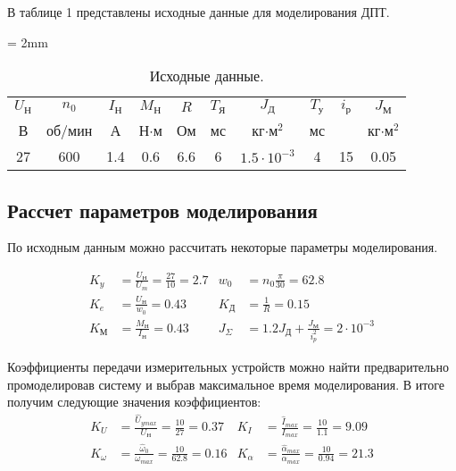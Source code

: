 \documentclass[a4paper, 12pt]{article}
\begin{document}
	В таблице 1 представлены исходные данные для моделирования ДПТ.
	\begin{table}[h!]
		\tabulinesep = 2mm
		\centering
		\begin{threeparttable}
			\caption{ Исходные данные.}\label{tab:perflogcross}
			\begin{tabular}{|c|c|c|c|c|c|c|c|c|c|}
				\hline
				$U_\text{Н}$ & $n_0$ & $I_\text{Н}$ & $M_\text{Н}$ & $R$ & $T_\text{Я}$ & $J_\text{Д}$ & $T_\text{у}$ & $i_\text{р}$ & $J_\text{М}$\\
				В & об/мин & А & Н$\cdot$м & Ом & мс & кг$\cdot\text{м}^2$ & мс & &  кг$\cdot\text{м}^2$ \\ \hline
				27 & 600 & 1.4 & 0.6 & 6.6 & 6 & $1.5\cdot10^{-3}$ & 4 & 15 & 0.05 \\
				\hline
			\end{tabular}
			
		\end{threeparttable}    
	\end{table}
	\newpage
	\begin{center}
		\section{Рассчет параметров моделирования}
	\end{center}
	\par По исходным данным можно рассчитать некоторые параметры моделирования.\par
	\begin{align*}
	K_y & = \frac{U_\text{Н}}{U_m} = \frac{27}{10} = 2.7 & w_0 & = n_0\frac{\pi}{30} = 62.8 \\
	K_e & = \frac{U_\text{Н}}{w_0} = 0.43 & K_\text{Д} & = \frac{1}{R} = 0.15 \\
	K_\text{М} & = \frac{M_\text{Н}}{I_\text{Н}} =  0.43 & J_{\Sigma} & = 1.2J_\text{Д} + \frac{J_\text{М}}{i^2_p} = 2 \cdot 10^{-3}
	\end{align*} \par
	Коэффициенты передачи измерительных устройств можно найти предварительно промоделировав систему и выбрав максимальное время моделирования. В итоге получим следующие значения коэффициентов: 
	\begin{align*}
	K_U & = \frac{\hat{U}_{ymax}}{U_\text{Н}} = \frac{10}{27} = 0.37  & K_I & = \frac{\hat{I}_{max}}{I_{max}} = \frac{10}{1.1} =  9.09\\
	K_\omega & = \frac{\hat{\omega}_{0}}{\omega_{max}} = \frac{10}{62.8} = 0.16 & K_\alpha & = \frac{\hat{\alpha}_{max}}{\alpha_{max}} = \frac{10}{0.94} = 21.3
	\end{align*}
	
\end{document}

